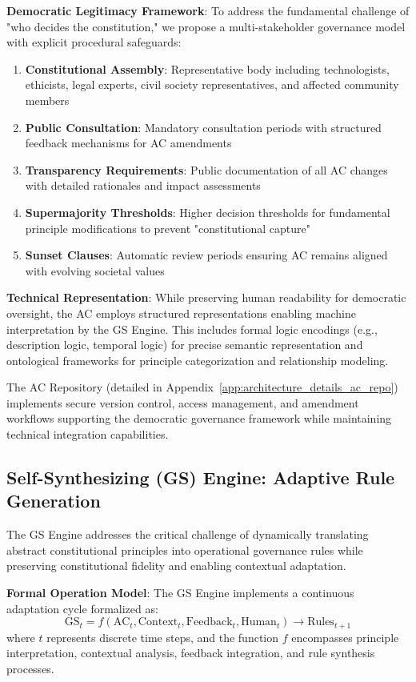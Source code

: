 \documentclass[sigconf,review,anonymous=false]{acmart} %
\begin{document}
\textbf{Democratic Legitimacy Framework}: To address the fundamental challenge of "who decides the constitution," we propose a multi-stakeholder governance model with explicit procedural safeguards:
\begin{enumerate}
    \item \textbf{Constitutional Assembly}: Representative body including technologists, ethicists, legal experts, civil society representatives, and affected community members
    \item \textbf{Public Consultation}: Mandatory consultation periods with structured feedback mechanisms for AC amendments
    \item \textbf{Transparency Requirements}: Public documentation of all AC changes with detailed rationales and impact assessments
    \item \textbf{Supermajority Thresholds}: Higher decision thresholds for fundamental principle modifications to prevent "constitutional capture"
    \item \textbf{Sunset Clauses}: Automatic review periods ensuring AC remains aligned with evolving societal values
\end{enumerate}

\textbf{Technical Representation}: While preserving human readability for democratic oversight, the AC employs structured representations enabling machine interpretation by the GS Engine. This includes formal logic encodings (e.g., description logic, temporal logic) for precise semantic representation and ontological frameworks for principle categorization and relationship modeling.

The AC Repository (detailed in Appendix~\ref{app:architecture_details_ac_repo}) implements secure version control, access management, and amendment workflows supporting the democratic governance framework while maintaining technical integration capabilities.

\subsection{Self-Synthesizing (GS) Engine: Adaptive Rule Generation}
\label{subsec:gs_engine_detailed}
The GS Engine addresses the critical challenge of dynamically translating abstract constitutional principles into operational governance rules while preserving constitutional fidelity and enabling contextual adaptation.

\textbf{Formal Operation Model}: The GS Engine implements a continuous adaptation cycle formalized as:
$$\text{GS}_t = f(\text{AC}_t, \text{Context}_t, \text{Feedback}_t, \text{Human}_t) \rightarrow \text{Rules}_{t+1}$$
where $t$ represents discrete time steps, and the function $f$ encompasses principle interpretation, contextual analysis, feedback integration, and rule synthesis processes.
\end{document}

